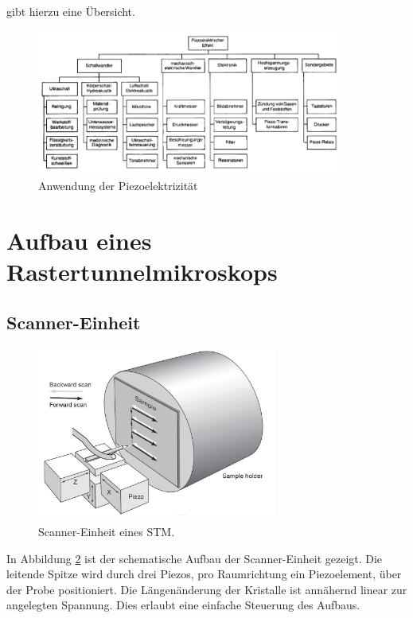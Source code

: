 gibt hierzu eine Übersicht. \cite{phying}
\begin{figure}[hb]
    \centering
    \includegraphics[width=0.9\textwidth]{Abb/piezo_anw.png}
    \caption{Anwendung der Piezoelektrizität \cite{phying}}
    \label{piezo_anw}
\end{figure}

\section{Aufbau eines Rastertunnelmikroskops}
    \subsection{Scanner-Einheit}

\begin{figure}[h]
    \centering
    \includegraphics[width=0.7\textwidth]{Abb/scanner.png}
    \caption{Scanner-Einheit eines STM. \cite{nanosurf}}
    \label{scan}
\end{figure}
In Abbildung \ref{scan} ist der schematische Aufbau der Scanner-Einheit gezeigt.
Die leitende Spitze wird durch drei Piezos, pro Raumrichtung ein Piezoelement, 
über der Probe positioniert. Die Längenänderung der Kristalle ist annähernd linear
zur angelegten Spannung. Dies erlaubt eine einfache Steuerung des Aufbaus.

